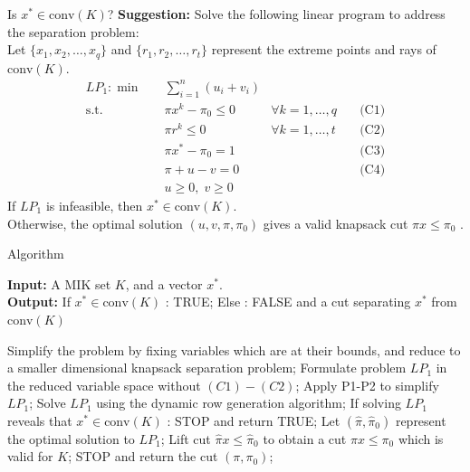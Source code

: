 \documentclass[aspectratio=169,xcolor=dvipsnames]{beamer}
\begin{document}
\begin{frame}{Is $x^* \in \text{conv}(K)$?}
	\vspace{-0.4cm}
    \textbf{Suggestion:} Solve the following linear program to address the separation problem:\\
    Let $\{x_1, x_2, \ldots, x_q\}$ and $\{r_1, r_2, \ldots, r_t\}$ represent the extreme points and rays of $\text{conv}(K)$.
	\vspace{-0.4cm}
    \small
	\begin{align*}
		LP_1 : \min \quad & \sum_{i=1}^{n} (u_i + v_i) \\
		\text{s.t.} \quad & \pi x^k - \pi_0 \leq 0 & \forall k = 1, \ldots, q & \quad \text{(C1)} \\
		& \pi r^k \leq 0 & \forall k = 1, \ldots, t & \quad \text{(C2)} \\
		& \pi x^* - \pi_0 = 1 & & \quad \text{(C3)} \\
		& \pi + u - v = 0 & & \quad \text{(C4)} \\
		& u \geq 0, \; v \geq 0 & &
	\end{align*}
	\vspace{-0.1cm}
	If $LP_1$ is infeasible, then $x^* \in \text{conv}(K)$.\\ 
	Otherwise, the optimal solution $(u, v, \pi, \pi_0)$ gives a valid knapsack cut $\pi x \leq \pi_0$ \cite{applegate2001tsp}.
\end{frame}

\begin{frame}{Algorithm}
	\begin{algorithm}[H]
		\caption{knapsack\_separator($K$, $x^*$)}
		\small
		\textbf{Input:} A MIK set $K$, and a vector $x^*$.\\
		\textbf{Output:} If $x^* \in \text{conv}(K)$ : TRUE; Else : FALSE and a cut separating $x^*$ from $\text{conv}(K)$\\
		\vspace{-0.4cm}
		\begin{algorithmic}[1]
			\State Simplify the problem by fixing variables which are at their bounds, and reduce to a smaller dimensional knapsack separation problem;
			\State Formulate problem $LP_1$ in the reduced variable space without $(C1) - (C2)$;
			\State Apply P1-P2 to simplify $LP_1$;
			\State Solve $LP_1$ using the dynamic row generation algorithm;
			\State If solving $LP_1$ reveals that $x^* \in \text{conv}(K)$ : STOP and return TRUE;
			\State Let $(\hat{\pi}, \hat{\pi}_0)$ represent the optimal solution to $LP_1$;
			\State Lift cut $\hat{\pi} x \leq \hat{\pi}_0$ to obtain a cut $\pi x \leq \pi_0$ which is valid for $K$;
			\State STOP and return the cut $(\pi, \pi_0)$;
		\end{algorithmic}
	\end{algorithm}
\end{frame}
\end{document}

